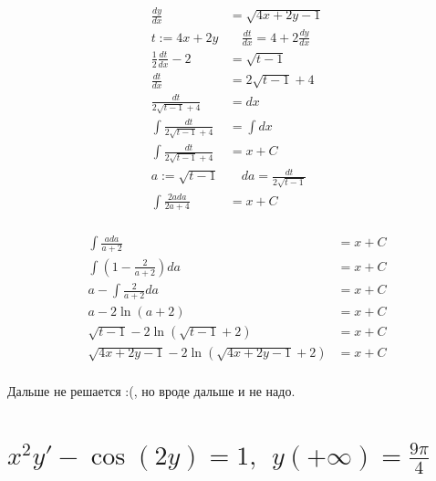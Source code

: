 \begin{align*}
    \frac{dy}{dx}                     & = \sqrt{4x + 2y - 1}                     \\
    t := 4x + 2y                      & \quad \frac{dt}{dx} = 4 + 2\frac{dy}{dx} \\
    \frac{1}{2}\frac{dt}{dx} - 2      & = \sqrt{t - 1}                           \\
    \frac{dt}{dx}                     & = 2\sqrt{t - 1} + 4                      \\
    \frac{dt}{2\sqrt{t - 1} + 4}      & = dx                                     \\
    \int \frac{dt}{2\sqrt{t - 1} + 4} & = \int dx                                \\
    \int \frac{dt}{2\sqrt{t - 1} + 4} & = x + C                                  \\
    a := \sqrt{t - 1}                 & \quad da = \frac{dt}{2\sqrt{t-1}}        \\
    \int \frac{2ada}{2a + 4}          & = x + C                                  \\
\end{align*}

\begin{align*}
    \int \frac{ada}{a + 2}                           & = x + C \\
    \int \left(1 - \frac{2}{a + 2}\right)da          & = x + C \\
    a - \int \frac{2}{a + 2}  da                     & = x + C \\
    a - 2 \ln(a+2)                                   & = x + C \\
    \sqrt{t - 1} - 2 \ln(\sqrt{t - 1}+2)             & = x + C \\
    \sqrt{4x + 2y - 1} - 2 \ln(\sqrt{4x + 2y - 1}+2) & = x + C \\
\end{align*}

Дальше не решается :(, но вроде дальше и не надо.

\section{$x^2y'-\cos(2y) = 1,\ \ y(+\infty)=\frac{9\pi}{4}$}

